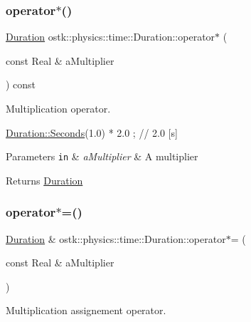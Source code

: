 \subsubsection{\texorpdfstring{operator$\ast$()}{operator*()}}
{\footnotesize\ttfamily \hyperlink{classostk_1_1physics_1_1time_1_1_duration}{Duration} ostk\+::physics\+::time\+::\+Duration\+::operator$\ast$ (\begin{DoxyParamCaption}\item[{const Real \&}]{a\+Multiplier }\end{DoxyParamCaption}) const}



Multiplication operator. 


\begin{DoxyCode}
\hyperlink{classostk_1_1physics_1_1time_1_1_duration_ad973fa34fcc308fdcc8d50c3ee694764}{Duration::Seconds}(1.0) * 2.0 ; \textcolor{comment}{// 2.0 [s]}
\end{DoxyCode}



\begin{DoxyParams}[1]{Parameters}
\mbox{\tt in}  & {\em a\+Multiplier} & A multiplier \\
\hline
\end{DoxyParams}
\begin{DoxyReturn}{Returns}
\hyperlink{classostk_1_1physics_1_1time_1_1_duration}{Duration} 
\end{DoxyReturn}
\mbox{\label{classostk_1_1physics_1_1time_1_1_duration_ae26dc624227d7c6d8cb4a7436c34a4ae}} 
\subsubsection{\texorpdfstring{operator$\ast$=()}{operator*=()}}
{\footnotesize\ttfamily \hyperlink{classostk_1_1physics_1_1time_1_1_duration}{Duration} \& ostk\+::physics\+::time\+::\+Duration\+::operator$\ast$= (\begin{DoxyParamCaption}\item[{const Real \&}]{a\+Multiplier }\end{DoxyParamCaption})}



Multiplication assignement operator. 


